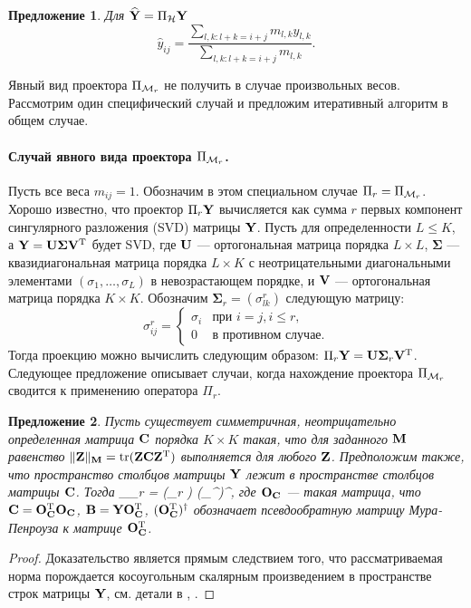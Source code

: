 \documentclass[12pt, specialist, subf,href,colorlinks=true,substylefile = spbu.rtx]{disser}
\DeclareMathOperator{\tr}{tr}
\newtheorem{proposition}{Предложение}
\theoremstyle{remark}
\theoremstyle{definition}
\begin{document}
\begin{proposition}
Для $\widehat{\mathbf{Y}}=\Pi_{\mathcal{H}} \mathbf{Y}$
\begin{equation}\label{diag_averag}
\hat{y}_{ij} = \frac{\sum_{l,k: l+k=i+j} m_{l,k} y_{l,k}}{\sum_{l,k: l+k=i+j} m_{l,k}}.
\end{equation}
\end{proposition}

Явный вид проектора $\Pi_{\mathcal{M}_r}$ не получить в случае произвольных весов.
Рассмотрим один специфический случай и предложим итеративный алгоритм в общем случае.

\paragraph{Случай явного вида проектора $\Pi_{\mathcal{M}_r}$.}
\label{sec:projMr}
\label{sec:obliqueSVD}
Пусть все веса $m_{ij}=1$. Обозначим в этом специальном случае $\Pi_r=\Pi_{\mathcal{M}_r}$.
Хорошо известно, что проектор $\Pi_{r} \mathbf{Y}$
вычисляется как сумма $r$ первых компонент сингулярного разложения (SVD) матрицы $\mathbf{Y}$. Пусть для определенности $L\le K$, а $\mathbf{Y} = \mathbf{U} \mathbf{\Sigma} \mathbf{V}^{\mathrm{T}}$ будет SVD, где $\mathbf{U}$ --- ортогональная матрица порядка $L \times L$, $\mathbf{\Sigma}$ --- квазидиагональная матрица порядка $L \times K$ с неотрицательными диагональными элементами $(\sigma_1, \ldots, \sigma_L)$ в невозрастающем порядке, и $\mathbf{V}$ --- ортогональная матрица порядка $K \times K$. Обозначим $\mathbf{\Sigma}_r = (\sigma^r_{l k})$ следующую матрицу:
\begin{equation*}
\sigma^r_{i j} = \begin{cases}
\sigma_i & \text{при $i = j, i \le r,$}\\
0 & \text{в противном случае}.
\end{cases}
\end{equation*}
Тогда проекцию можно вычислить следующим образом: $\Pi_{r} \mathbf{Y}  = \mathbf{U} \mathbf{\Sigma}_r \mathbf{V}^{\mathrm{T}}$.
Следующее предложение описывает случаи, когда нахождение проектора $\Pi_{\mathcal{M}_r}$ сводится к применению оператора $\Pi_r$.

\begin{proposition}
\label{prop:projS}
Пусть существует симметричная, неотрицательно оп\-ре\-де\-лен\-ная матрица  $\mathbf{C}$ порядка $K \times K$ 
такая, что для заданного $\mathbf{M}$ равенство $\|\bfZ\|_\bfM = \tr(\bfZ \bfC \bfZ^\rmT)$ выполняется для любого $\mathbf{Z}$.
Предположим также, что пространство столбцов матрицы $\mathbf{Y}$ лежит в пространстве столбцов матрицы $\mathbf{C}$.
Тогда
\be
\label{eq:PiMr}
\Pi_{\calM_r} \bfY = (\Pi_r \bfB) (\bfO_\bfC^{\rmT})^\dagger,
\ee
где $\mathbf{O}_{\mathbf{C}}$ --- такая матрица, что $\mathbf{C} = \mathbf{O}_{\mathbf{C}}^{\mathrm{T}}\mathbf{O}_{\mathbf{C}}$,
$\mathbf{B} = \mathbf{Y} \mathbf{O}_{\mathbf{C}}^{\mathrm{T}}$, $(\mathbf{O}_{\mathbf{C}}^{\mathrm{T}})^\dagger$ обозначает псевдообратную матрицу Мура-Пенроуза к матрице $\mathbf{O}_{\mathbf{C}}^{\mathrm{T}}$.
\end{proposition}
\begin{proof}
Доказательство является прямым следствием того, что рассматриваемая норма порождается косоугольным скалярным произведением в пространстве строк матрицы $\mathbf{Y}$, см. детали в \cite{Golyandina2013}, \cite{Allen2014}.
\end{proof}
\end{document}
